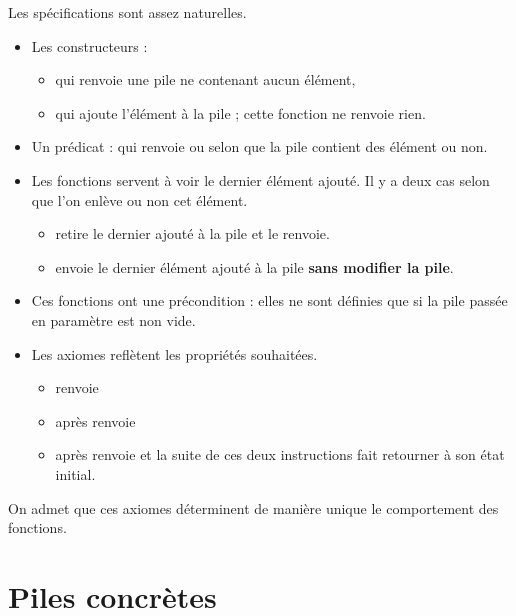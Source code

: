 Les spécifications sont assez naturelles.
\begin{itemize}
\item Les constructeurs : 
\begin{itemize}
\item {} qui renvoie une pile ne contenant aucun élément,
\item {} qui ajoute l'élément  à la pile  ; cette fonction ne renvoie rien.
\end{itemize}
\item Un prédicat : qui renvoie  ou  selon que la pile  contient des élément ou non.

\item Les fonctions servent à voir le dernier élément ajouté. Il y a deux cas selon que l'on enlève ou non cet élément.
\begin{itemize}
\item {} retire le dernier ajouté à la pile et le renvoie.
\item {} envoie le dernier élément ajouté à la pile {\bf sans modifier la pile}.
\end{itemize}
\item Ces fonctions ont une précondition : elles ne sont définies que si la pile passée en paramètre est non vide.
\item Les axiomes reflètent les propriétés souhaitées.
\begin{itemize}
\item {} renvoie 
\item {} après  renvoie 
\item {} après  renvoie  et la suite de ces deux instructions fait retourner  à son état initial.
\end{itemize}
\end{itemize}
On admet que ces axiomes déterminent de manière unique le comportement des fonctions.
\section{Piles concrètes}
